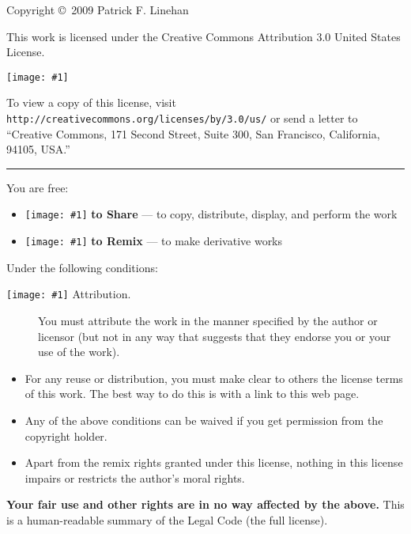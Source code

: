 \newcommand{\includeccgraphics}[1]{\texttt{[image: \#1]}}

\begin{center}

  Copyright \copyright\ 2009 Patrick F. Linehan

  \bigskip

  This work is licensed under the Creative Commons Attribution 3.0 United States License.

  \medskip

  \includeccgraphics{cc}

  \medskip

  To view a copy of this license, visit
  \texttt{http://creativecommons.org/licenses/by/3.0/us/}
  or send a letter to ``Creative Commons, 171 Second Street, Suite 300, San Francisco, California, 94105, USA.''

\rule{4cm}{1pt}

\end{center}

\noindent You are free:

\begin{itemize}
  \item \includeccgraphics{share} \textbf{to Share} --- to copy, distribute, display, and perform the work
  \item \includeccgraphics{remix} \textbf{to Remix} --- to make derivative works
\end{itemize}

\noindent Under the following conditions:

\begin{description}

  \item[\includeccgraphics{by} Attribution.] You must attribute the work in the manner specified by the author or licensor (but
  not in any way that suggests that they endorse you or your use of the work).

\end{description}

\begin{itemize}

\item For any reuse or distribution, you must make clear to others the license terms of this work. The best way to do this is with a link to this web page.
\item Any of the above conditions can be waived if you get permission from the copyright holder.
\item Apart from the remix rights granted under this license, nothing in this license impairs or restricts the author's moral rights.

\end{itemize}

\noindent\textbf{Your fair use and other rights are in no way affected
by the above.}  This is a human-readable summary of the Legal Code (the full license). 

\clearpage

